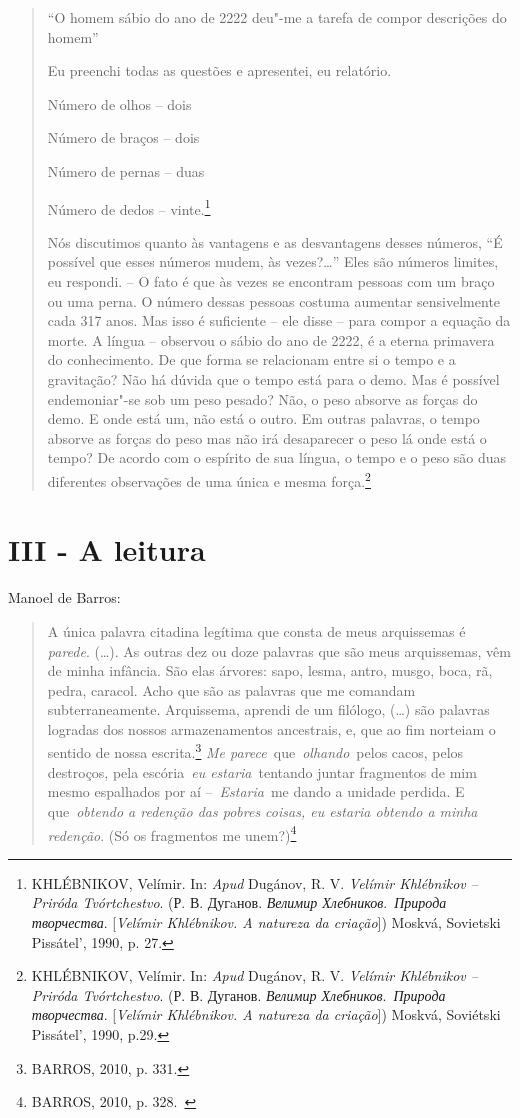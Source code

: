 \begin{quote}
``O homem sábio do ano de 2222 deu"-me a tarefa de compor descrições do
homem''

Eu preenchi todas as questões e apresentei, eu relatório.

Número de olhos -- dois

Número de braços -- dois

Número de pernas -- duas

Número de dedos -- vinte.\footnote{KHLÉBNIKOV, Velímir. In: \emph{Apud}
  Dugánov, R. V. \emph{Velímir Khlébnikov -- Priróda Tvórtchestvo}. (Р.
  В. Дугaнов. \emph{Велимир Хлебников}.~\emph{Природа творчества}.
  {[}\emph{Velímir Khlébnikov. A natureza da criação}{]}) Moskvá,
  Sovietski Pissátel', 1990, p. 27.}

Nós discutimos quanto às vantagens e as desvantagens desses números, ``É
possível que esses números mudem, às vezes?\ldots{}'' Eles são números
limites, eu respondi. -- O fato é que às vezes se encontram pessoas com
um braço ou uma perna. O número dessas pessoas costuma aumentar
sensivelmente cada 317 anos. Mas isso é suficiente -- ele disse -- para
compor a equação da morte. A língua -- observou o sábio do ano de 2222,
é a eterna primavera do conhecimento. De que forma se relacionam entre
si o tempo e a gravitação? Não há dúvida que o tempo está para o demo.
Mas é possível endemoniar"-se sob um peso pesado? Não, o peso absorve as
forças do demo. E onde está um, não está o outro. Em outras palavras, o
tempo absorve as forças do peso mas não irá desaparecer o peso lá onde
está o tempo? De acordo com o espírito de sua língua, o tempo e o peso
são duas diferentes observações de uma única e mesma força.\footnote{KHLÉBNIKOV,
  Velímir. In: \emph{Apud} Dugánov, R. V. \emph{Velímir Khlébnikov --
  Priróda Tvórtchestvo}. (Р. В. Дуганов. \emph{Велимир
  Хлебников}.~\emph{Природа творчества}. {[}\emph{Velímir Khlébnikov. A
  natureza da criação}{]}) Moskvá, Soviétski Pissátel', 1990, p.29.}
\end{quote}

\section{III - A leitura}

Manoel de Barros:

\begin{quote}
A única palavra citadina legítima que consta de meus arquissemas é
\emph{parede}. (\ldots{}). As outras dez ou doze palavras que são meus
arquissemas, vêm de minha infância. São elas árvores: sapo, lesma,
antro, musgo, boca, rã, pedra, caracol. Acho que são as palavras que me
comandam subterraneamente. Arquissema, aprendi de um filólogo, (\ldots{}) são
palavras logradas dos nossos armazenamentos ancestrais, e, que ao fim
norteiam o sentido de nossa escrita.\footnote{BARROS, 2010, p. 331.}
\emph{Me parece}~que~\emph{olhando}~pelos cacos, pelos destroços, pela
escória~\emph{eu estaria}~tentando juntar fragmentos de mim mesmo
espalhados por aí --~\emph{Estaria}~me dando a unidade perdida. E
que~\emph{obtendo a redenção das pobres coisas, eu estaria obtendo a
minha redenção}. (Só os fragmentos me unem?)\footnote{BARROS, 2010, p.
  328.~}
\end{quote}

